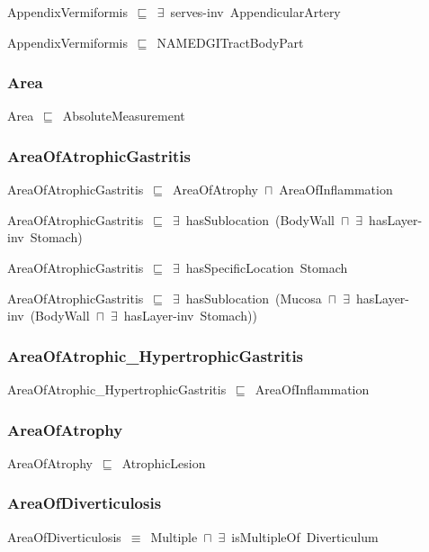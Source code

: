 \documentclass{article}
\begin{document}
AppendixVermiformis~\ensuremath{\sqsubseteq}~\ensuremath{\exists}~serves-inv~AppendicularArtery~

AppendixVermiformis~\ensuremath{\sqsubseteq}~NAMEDGITractBodyPart~

\subsubsection*{Area}

Area~\ensuremath{\sqsubseteq}~AbsoluteMeasurement~

\subsubsection*{AreaOfAtrophicGastritis}

AreaOfAtrophicGastritis~\ensuremath{\sqsubseteq}~AreaOfAtrophy~\ensuremath{\sqcap}~AreaOfInflammation~

AreaOfAtrophicGastritis~\ensuremath{\sqsubseteq}~\ensuremath{\exists}~hasSublocation~(BodyWall~\ensuremath{\sqcap}~\ensuremath{\exists}~hasLayer-inv~Stomach)~

AreaOfAtrophicGastritis~\ensuremath{\sqsubseteq}~\ensuremath{\exists}~hasSpecificLocation~Stomach~

AreaOfAtrophicGastritis~\ensuremath{\sqsubseteq}~\ensuremath{\exists}~hasSublocation~(Mucosa~\ensuremath{\sqcap}~\ensuremath{\exists}~hasLayer-inv~(BodyWall~\ensuremath{\sqcap}~\ensuremath{\exists}~hasLayer-inv~Stomach))~

\subsubsection*{AreaOfAtrophic_HypertrophicGastritis}

AreaOfAtrophic\_HypertrophicGastritis~\ensuremath{\sqsubseteq}~AreaOfInflammation~

\subsubsection*{AreaOfAtrophy}

AreaOfAtrophy~\ensuremath{\sqsubseteq}~AtrophicLesion~

\subsubsection*{AreaOfDiverticulosis}

AreaOfDiverticulosis~\ensuremath{\equiv}~Multiple~\ensuremath{\sqcap}~\ensuremath{\exists}~isMultipleOf~Diverticulum
\end{document}
